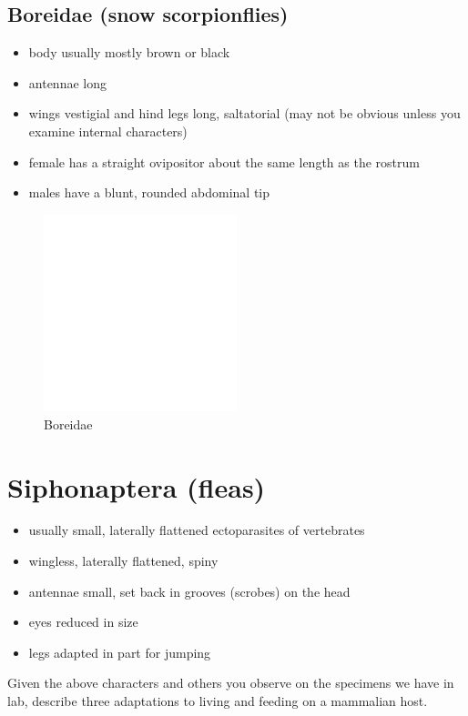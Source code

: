 \documentclass[letterpaper, 11pt]{article}
\begin{document}
\subsection{Boreidae (snow scorpionflies)}
\begin{itemize}
\item body usually mostly brown or black 
\item antennae long
\item wings vestigial and hind legs long, saltatorial (may not be obvious unless you examine internal characters)
\item female has a straight ovipositor about the same length as the rostrum
\item males have a blunt, rounded abdominal tip
\end{itemize}

\begin{figure}[ht!]
  \centering
    \includegraphics[width=0.5\textwidth]{blank}
  \caption{Boreidae}
  \label{fig:boreid}
\end{figure}

\section{Siphonaptera (fleas)}
\begin{itemize}
\item usually small, laterally flattened ectoparasites of vertebrates
\item wingless, laterally flattened, spiny
\item antennae small, set back in grooves (scrobes) on the head
\item eyes reduced in size
\item legs adapted in part for jumping
\end{itemize}
Given the above characters and others you observe on the specimens we have in lab, describe three adaptations to living and feeding on a mammalian host.\vspace{3cm}
\end{document}
